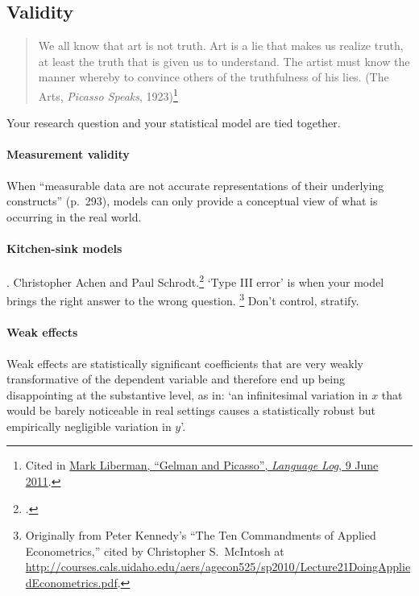 \subsection{Validity}

\begin{quote}
	We all know that art is not truth. Art is a lie that makes us realize truth, at least the truth that is given us to understand. The artist must know the manner whereby to convince others of the truthfulness of his lies. (The Arts, \emph{Picasso Speaks}, 1923)\footnote{Cited in \href{http://languagelog.ldc.upenn.edu/nll/?p=3103}{Mark Liberman, ``Gelman and Picasso'', \emph{Language Log}, 9 June 2011}.}
\end{quote}

Your research question and your statistical model are tied together. 

\paragraph{Measurement validity} When ``measurable data are not accurate representations of their underlying constructs'' (p.~293), models can only provide a conceptual view of what is occurring in the real world.\cite{Shmueli:2010a}

\paragraph{Kitchen-sink models}. Christopher Achen and Paul Schrodt.\footcite{Schrodt:2011a} `Type III error' is when your model brings the right answer to the wrong question.%
     \footnote{Originally from Peter Kennedy's ``The Ten Commandments of Applied Econometrics,'' cited by Christopher S.~McIntosh at \url{http://courses.cals.uidaho.edu/aers/agecon525/sp2010/Lecture21DoingAppliedEconometrics.pdf}.} %
     Don't control, stratify.

\paragraph{Weak effects} Weak effects are statistically significant coefficients that are very weakly transformative of the dependent variable and therefore end up being disappointing at the substantive level, as in: `an infinitesimal variation in $x$ that would be barely noticeable in real settings causes a statistically robust but empirically negligible variation in $y$'.%


